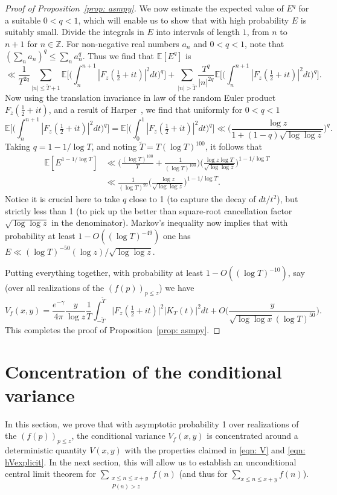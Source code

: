 \documentclass[12pt, notitlepage]{amsart}
\numberwithin{equation}{section}
\def\E{\mathbb E}
\def\TT{\widetilde{T}}
\theoremstyle{remark}
\theoremstyle{definition}
\theoremstyle{remark}
\numberwithin{equation}{section}
\begin{document}
\begin{proof}[Proof of Proposition~\ref{prop: asmpy}]
We now estimate the expected value of $E^q$ for a suitable $0<q<1$, which will enable us to show that with high probability $E$ is suitably small.   Divide the integrals in $E$ into intervals of length $1$, from $n$ to $n+1$ for $n\in {\mathbb Z}$.   For non-negative real numbers $a_n$ and $0<q <1$, note that  $(\sum_n a_n)^q \le \sum_n a_n^q$.   Thus we find that $\E[E^q]$ is 
$$ 
\ll  \frac{1}{T^{2q}} \sum_{|n| \le \TT+1} \E \Big[ \Big( \int_{n}^{n+1} |F_z(\tfrac 12+it)|^2 dt \Big)^q \Big] 
+   \sum_{|n| > \TT} \frac{T^q}{|n|^{2q}}  \E \Big[ \Big( \int_{n}^{n+1} |F_z(\tfrac 12+it)|^2 dt \Big)^q \Big].
$$ 
Now using the translation invariance in law of the random Euler product $F_z(\frac{1}{2} +it)$, and a result of Harper~\cite[Section 4]{HarperLow}, we find that uniformly for $0<q<1$ 
$$ 
\E\Big[ \Big( \int_{n}^{n+1} |F_z(\tfrac 12+it)|^2 dt \Big)^q \Big]  = \E\Big[ \Big( \int_{0}^{1} |F_z(\tfrac 12+it)|^2 dt \Big)^q \Big] \ll  \Big(\frac{\log z}{1 + (1-q)\sqrt{\log \log z}}\Big)^{q}.   
$$
Taking $q=1-1/\log T$,  and noting $\TT =T(\log T)^{100}$,  it follows that 
 \begin{align*}
 \E[E^{1-1/\log T}] &\ll \Big( \frac{(\log T)^{100}}{T} + \frac{1}{(\log T)^{100}}\Big) \Big( \frac{\log z \log T}{\sqrt{\log \log z}}\Big)^{1-1/\log T} 
\\
& \ll \frac{1}{(\log T)^{99}} \Big(\frac{\log z}{\sqrt{\log \log z}}\Big)^{1-1/\log T}. 
\end{align*}
Notice it is crucial here to take $q$ close to 1 (to capture the decay of ${dt}/{t^2}$), but strictly less than 1 (to pick up the better than square-root cancellation factor $\sqrt{\log\log z}$ in the denominator). Markov's inequality now implies that with probability at least $1-O((\log T)^{-49})$ one has $E \ll (\log T)^{-50} (\log z)/\sqrt{\log \log z}$.   
 
Putting everything together,  with probability at least $1-O((\log T)^{-10})$, say (over all realizations of the $(f(p))_{p \leq z}$) we have
\begin{equation}\label{eqn: Vtrunc}
V_f(x, y) = \frac{e^{-\gamma}}{4\pi} \frac{y}{\log z} \frac{1}{T} \int_{-\TT}^{\TT} \Big|F_z(\tfrac{1}{2}+it)\Big|^{2}|K_T(t)|^{2} dt +O\big(\frac{y}{\sqrt{\log \log x}(\log T)^{50}}\big).
\end{equation} 
This completes the proof of Proposition~\ref{prop: asmpy}. 
\end{proof}



  \section{Concentration of the conditional variance}\label{SEC: CONCEN}
 In this section, we prove that with asymptotic probability 1 over realizations of the $(f(p))_{p \leq z}$, the conditional variance $V_f(x, y)$ is concentrated around a deterministic quantity $V(x,y)$ with the properties claimed in \eqref{eqn: V} and \eqref{eqn: hVexplicit}. In the next section, this will allow us to establish an unconditional central limit theorem for $\sum_{\substack{x \le n \le x+y \\ P(n) > z  }  } f(n)$ (and thus for $\sum_{x\le n \le x+y}f(n)$). 
\end{document}
